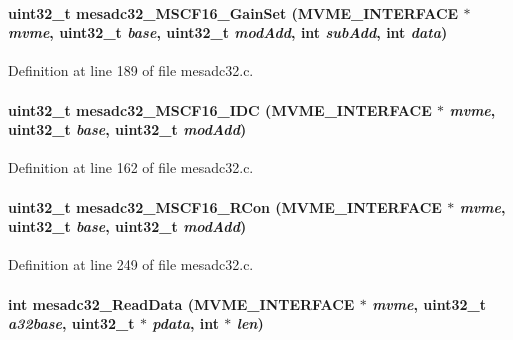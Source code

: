 \paragraph[{mesadc32\_\-MSCF16\_\-GainSet}]{\setlength{\rightskip}{0pt plus 5cm}uint32\_\-t mesadc32\_\-MSCF16\_\-GainSet ({\bf MVME\_\-INTERFACE} $\ast$ {\em mvme}, \/  uint32\_\-t {\em base}, \/  uint32\_\-t {\em modAdd}, \/  int {\em subAdd}, \/  int {\em data})}\hfill\label{mesadc32drv_8h_aee29b5ee58040c1c1c428e30a6fec9e9}


Definition at line 189 of file mesadc32.c.
\paragraph[{mesadc32\_\-MSCF16\_\-IDC}]{\setlength{\rightskip}{0pt plus 5cm}uint32\_\-t mesadc32\_\-MSCF16\_\-IDC ({\bf MVME\_\-INTERFACE} $\ast$ {\em mvme}, \/  uint32\_\-t {\em base}, \/  uint32\_\-t {\em modAdd})}\hfill\label{mesadc32drv_8h_ad6b5a83a7f9745c0102e5f6816e19e9b}


Definition at line 162 of file mesadc32.c.
\paragraph[{mesadc32\_\-MSCF16\_\-RCon}]{\setlength{\rightskip}{0pt plus 5cm}uint32\_\-t mesadc32\_\-MSCF16\_\-RCon ({\bf MVME\_\-INTERFACE} $\ast$ {\em mvme}, \/  uint32\_\-t {\em base}, \/  uint32\_\-t {\em modAdd})}\hfill\label{mesadc32drv_8h_ab06d3b413709d879215193ace551370a}


Definition at line 249 of file mesadc32.c.
\paragraph[{mesadc32\_\-ReadData}]{\setlength{\rightskip}{0pt plus 5cm}int mesadc32\_\-ReadData ({\bf MVME\_\-INTERFACE} $\ast$ {\em mvme}, \/  uint32\_\-t {\em a32base}, \/  uint32\_\-t $\ast$ {\em pdata}, \/  int $\ast$ {\em len})}\hfill\label{mesadc32drv_8h_a4efc9ff676fe3320ebdd8a64356b861c}


